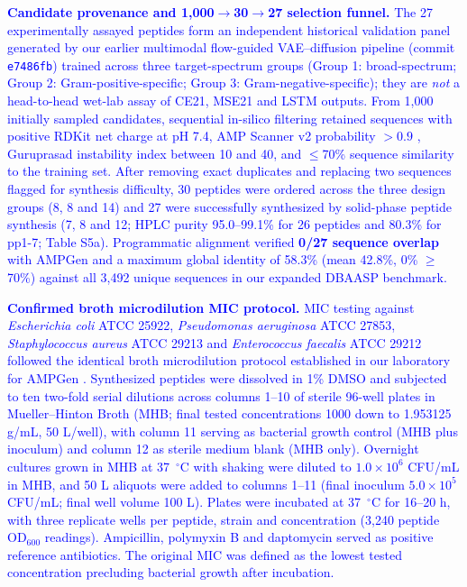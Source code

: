 \documentclass[unnumsec,webpdf,contemporary,large]{oup-authoring-template}
\newcommand{\rev}[1]{\textcolor{blue}{#1}}
\begin{document}
\rev{\textbf{Candidate provenance and 1,000$\rightarrow$30$\rightarrow$27 selection funnel.} The 27 experimentally assayed peptides form an independent historical validation panel generated by our earlier multimodal flow-guided VAE--diffusion pipeline (commit \texttt{e7486fb}) trained across three target-spectrum groups (Group 1: broad-spectrum; Group 2: Gram-positive-specific; Group 3: Gram-negative-specific); they are \emph{not} a head-to-head wet-lab assay of CE21, MSE21 and LSTM outputs. From 1,000 initially sampled candidates, sequential in-silico filtering retained sequences with positive RDKit net charge at pH 7.4, AMP Scanner v2 probability $>0.9$ \cite{refAMPScanner}, Guruprasad instability index between 10 and 40, and $\leq$70\% sequence similarity to the training set. After removing exact duplicates and replacing two sequences flagged for synthesis difficulty, 30 peptides were ordered across the three design groups (8, 8 and 14) and 27 were successfully synthesized by solid-phase peptide synthesis (7, 8 and 12; HPLC purity 95.0--99.1\% for 26 peptides and 80.3\% for pp1-7; Table S5a). Programmatic alignment verified \textbf{0/27 sequence overlap} with AMPGen \cite{ref9} and a maximum global identity of 58.3\% (mean 42.8\%, 0\% $\geq$70\%) against all 3,492 unique sequences in our expanded DBAASP benchmark.}

\rev{\textbf{Confirmed broth microdilution MIC protocol.} MIC testing against \textit{Escherichia coli} ATCC 25922, \textit{Pseudomonas aeruginosa} ATCC 27853, \textit{Staphylococcus aureus} ATCC 29213 and \textit{Enterococcus faecalis} ATCC 29212 followed the identical broth microdilution protocol established in our laboratory for AMPGen \cite{ref9,ref64,ref65,ref66}. Synthesized peptides were dissolved in 1\% DMSO and subjected to ten two-fold serial dilutions across columns 1--10 of sterile 96-well plates in Mueller--Hinton Broth (MHB; final tested concentrations 1000 down to 1.953125 \textmu{}g/mL, 50 \textmu{}L/well), with column 11 serving as bacterial growth control (MHB plus inoculum) and column 12 as sterile medium blank (MHB only). Overnight cultures grown in MHB at 37~$^\circ$C with shaking were diluted to $1.0\times 10^6$ CFU/mL in MHB, and 50 \textmu{}L aliquots were added to columns 1--11 (final inoculum $5.0\times 10^5$ CFU/mL; final well volume 100 \textmu{}L). Plates were incubated at 37~$^\circ$C for 16--20 h, with three replicate wells per peptide, strain and concentration (3,240 peptide OD$_{600}$ readings). Ampicillin, polymyxin B and daptomycin served as positive reference antibiotics. The original MIC was defined as the lowest tested concentration precluding bacterial growth after incubation.}
\end{document}
